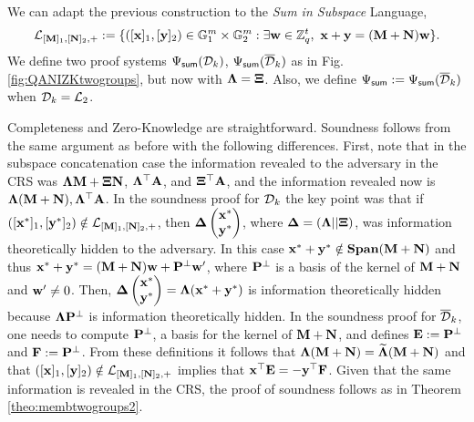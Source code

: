 We can adapt the previous construction to the \textit{Sum in Subspace} Language, 
 $$\mathcal{L}_{[\mathbf{{M}}]_1,[\mathbf{{N}}]_2,+}:=\{ ([\mathbf{x}]_1,[\mathbf{y}]_2) \in \mathbb{G}_1^{m} \times \mathbb{G}_2^{m} :  \exists \mathbf{w} \in \mathbb{Z}_q^{t}, \  \mathbf{x}+\mathbf{y}=(\mathbf{{M}}+\mathbf{{N}}) \mathbf{w}\}.$$
 We define two proof systems $\Psi_{\mathsf{sum}}(\mathcal{D}_k)$, $\Psi_{\mathsf{sum}}(\overline{\mathcal{D}}_k)$ as in Fig. \ref{fig:QANIZKtwogroups}, but now 
with $\mathbf{{\Lambda}}=\mathbf{{\Xi}}$. Also, we define $\Psi_{\mathsf{sum}}:=\Psi_{\mathsf{sum}}(\overline{\mathcal{D}}_k)$ when $\mathcal{D}_k=\mathcal{L}_2$.

Completeness and Zero-Knowledge are straightforward. Soundness follows from the same argument as before with the following differences. First, note that in the subspace concatenation case the information revealed to the adversary in the CRS was $\mathbf{{\Lambda}}\mathbf{{M}}+\mathbf{{\Xi}}\mathbf{{N}}$, $\mathbf{{\Lambda}}^\top\mathbf{{A}}$, and $\mathbf{{\Xi}}^\top\mathbf{{A}}$, and the information revealed now is $\mathbf{{\Lambda}}(\mathbf{{M}}+\mathbf{{N}}),\mathbf{{\Lambda}}^{\top}\mathbf{{A}}$. In the soundness proof for $\mathcal{D}_k$ the key point was that if $([\mathbf{x}^*]_1,[\mathbf{y}^*]_2)\notin\mathcal{L}_{[\mathbf{{M}}]_1,[\mathbf{{N}}]_2,+}$, then $\mathbf{{\Delta}}\left(\begin{matrix}\mathbf{x}^*\\\mathbf{y}^*\end{matrix}\right)$, where $\mathbf{{\Delta}}=(\mathbf{{\Lambda}}||\mathbf{{\Xi}})$, was information theoretically hidden to the adversary. In this case $\mathbf{x}^*+\mathbf{y}^*\notin\mathbf{Span}(\mathbf{{M}}+\mathbf{{N}})$ and thus $\mathbf{x}^*+\mathbf{y}^*=(\mathbf{{M}}+\mathbf{{N}})\mathbf{w}+\mathbf{{P}}^\bot\mathbf{w}'$, where $\mathbf{{P}}^\bot$ is a basis of the kernel of $\mathbf{{M}}+\mathbf{{N}}$ and $\mathbf{w}'\neq 0$. Then, $\mathbf{{\Delta}}\left(\begin{matrix}\mathbf{x}^*\\\mathbf{y}^*\end{matrix}\right)=\mathbf{{\Lambda}}(\mathbf{x}^*+\mathbf{y}^*)$ is information theoretically hidden because $\mathbf{{\Lambda}}\mathbf{{P}}^\bot$ is information theoretically hidden. In the soundness proof for $\overline{\mathcal{D}}_k$, one needs to compute $\mathbf{{P}}^\bot$, a basis for the kernel of $\mathbf{{M}}+\mathbf{{N}}$, and defines $\mathbf{{E}}:=\mathbf{{P}}^\bot$ and $\mathbf{{F}}:=\mathbf{{P}}^\bot$. From these definitions it follows that $\mathbf{{\Lambda}}(\mathbf{{M}}+\mathbf{{N}})=\widetilde{\mathbf{{\Lambda}}}(\mathbf{{M}}+\mathbf{{N}})$ and that $([\mathbf{x}]_1,[\mathbf{y}]_2)\notin\mathcal{L}_{[\mathbf{{M}}]_1,[\mathbf{{N}}]_2,+}$ implies that $\mathbf{x}^\top\mathbf{{E}}=-\mathbf{y}^\top\mathbf{{F}}$. Given that the same information is revealed in the CRS, the proof of soundness follows as in Theorem \ref{theo:membtwogroups2}.
